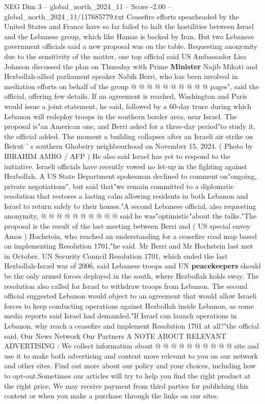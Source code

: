 \begin{textsample}{NEG Dim 3 – global\_north\_2024\_11 – Score -2.00 – global\_north\_2024\_11/117685779.txt}
Ceasefire efforts spearheaded by the United States and France have so far failed to halt the hostilities between Israel and the Lebanese group, which like Hamas is backed by Iran.
But two Lebanese government officials said a new proposal was on the table.
Requesting anonymity due to the sensitivity of the matter, one top official said US Ambassador Lisa Johnson discussed the plan on Thursday with Prime \textbf{Minister} Najib Mikati and Hezbollah-allied parliament speaker Nabih Berri, who has been involved in mediation efforts on behalf of the group @ @ @ @ @ @ @ @ @ @ pages", said the official, offering few details.
If an agreement is reached, Washington and Paris would issue a joint statement, he said, followed by a 60-day truce during which Lebanon will redeploy troops in the southern border area, near Israel.
The proposal is"an American one, and Berri asked for a three-day period"to study it, the official added.
The moment a building collapses after an Israeli air strike on Beirut ' s southern Ghobeiry neighbourhood on November 15, 2024. ( Photo by IBRAHIM AMRO / AFP ) He also said Israel has yet to respond to the initiative.
Israeli officials have recently vowed no let-up in the fighting against Hezbollah.
A US State Department spokesman declined to comment on"ongoing, private negotiations", but said that"we remain committed to a diplomatic resolution that restores a lasting calm allowing residents in both Lebanon and Israel to return safely to their homes."A second Lebanese official, also requesting anonymity, @ @ @ @ @ @ @ @ @ @ said he was"optimistic"about the talks."The proposal is the result of the last meeting between Berri and ( US special envoy Amos ) Hochstein, who reached an understanding for a ceasefire road map based on implementing Resolution 1701,"he said.
Mr Berri and Mr Hochstein last met in October.
UN Security Council Resolution 1701, which ended the last Hezbollah-Israel war of 2006, said Lebanese troops and UN \textbf{peacekeepers} should be the only armed forces deployed in the south, where Hezbollah holds sway.
The resolution also called for Israel to withdraw troops from Lebanon.
The second official suggested Lebanon would object to an agreement that would allow Israeli forces to keep conducting operations against Hezbollah inside Lebanon, as some media reports said Israel had demanded."If Israel can launch operations in Lebanon, why reach a ceasefire and implement Resolution 1701 at all?"the official said.
Our News Network Our Partners A NOTE ABOUT RELEVANT ADVERTISING : We collect information about @ @ @ @ @ @ @ @ @ @ site and use it to make both advertising and content more relevant to you on our network and other sites.
Find out more about our policy and your choices, including how to opt-out.Sometimes our articles will try to help you find the right product at the right price.
We may receive payment from third parties for publishing this content or when you make a purchase through the links on our sites.

\end{textsample}
